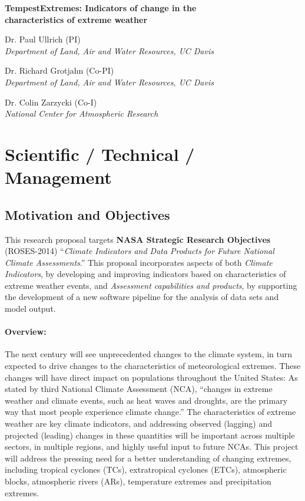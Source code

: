 \documentclass[11pt]{article}
\begin{document}

\begin{center}
{\large \textbf{TempestExtremes: Indicators of change in the \\ characteristics of extreme weather}}

Dr. Paul Ullrich (PI) \\
\textit{Department of Land, Air and Water Resources, UC Davis}

Dr. Richard Grotjahn (Co-PI) \\
\textit{Department of Land, Air and Water Resources, UC Davis}

Dr. Colin Zarzycki (Co-I) \\
\textit{National Center for Atmospheric Research}
\end{center}

\begin{spacing}{-1.0}
\tableofcontents
\end{spacing}

\clearpage

\setcounter{page}{1}

\section{Scientific / Technical / Management}

\subsection{Motivation and Objectives}

This research proposal targets \textbf{NASA Strategic Research Objectives} (ROSES-2014) ``\textit{Climate Indicators and Data Products for Future National Climate Assessments}.''  This proposal incorporates aspects of both \textit{Climate Indicators}, by developing and improving indicators based on characteristics of extreme weather events, and \textit{Assessment capabilities and products}, by supporting the development of a new software pipeline for the analysis of data sets and model output.

\paragraph{Overview:}  The next century will see unprecedented changes to the climate system, in turn expected to drive changes to the characteristics of meteorological extremes. These changes will have direct impact on populations throughout the United States: As stated by third National Climate Assessment (NCA), ``changes in extreme weather and climate events, such as heat waves and droughts, are the primary way that most people experience climate change.'' The characteristics of extreme weather are key climate indicators, and addressing observed (lagging) and projected (leading) changes in these quantities will be important across multiple sectors, in multiple regions, and highly useful input to future NCAs.  This project will address the pressing need for a better understanding of changing extremes, including tropical cyclones (TCs), extratropical cyclones (ETCs), atmospheric blocks, atmospheric rivers (ARs), temperature extremes and precipitation extremes. 
\end{document}
